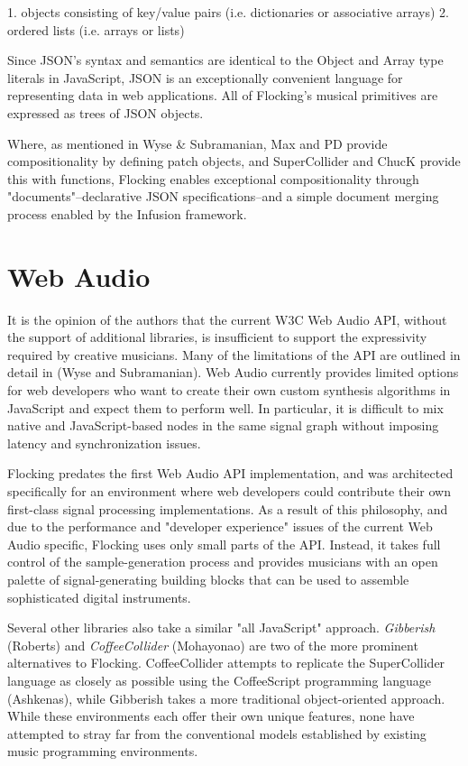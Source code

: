 \documentclass{article}
\begin{document}
1. objects consisting of key/value pairs (i.e. dictionaries or associative arrays)
2. ordered lists (i.e. arrays or lists)

Since JSON's syntax and semantics are identical to the Object and Array type literals in JavaScript, JSON is an exceptionally convenient language for representing data in web applications. All of Flocking's musical primitives are expressed as trees of JSON objects.


Where, as mentioned in Wyse \& Subramanian, Max and PD provide compositionality by defining patch objects, and SuperCollider and ChucK provide this with functions, Flocking enables exceptional compositionality through "documents"--declarative JSON specifications--and a simple document merging process enabled by the Infusion framework.

\section{Web Audio}

It is the opinion of the authors that the current W3C Web Audio API, without the support of additional libraries, is insufficient to support the expressivity required by creative musicians. Many of the limitations of the API are outlined in detail in (Wyse and Subramanian). Web Audio currently provides limited options for web developers who want to create their own custom synthesis algorithms in JavaScript and expect them to perform well. In particular, it is difficult to mix native and JavaScript-based nodes in the same signal graph without imposing latency and synchronization issues.

Flocking predates the first Web Audio API implementation, and was architected specifically for an environment where web developers could contribute their own first-class signal processing implementations. As a result of this philosophy, and due to the performance and "developer experience" issues of the current Web Audio specific, Flocking uses only small parts of the API. Instead, it takes full control of the sample-generation process and provides musicians with an open palette of signal-generating building blocks that can be used to assemble sophisticated digital instruments.

Several other libraries also take a similar "all JavaScript" approach. {\it Gibberish} (Roberts) and {\it CoffeeCollider} (Mohayonao) are two of the more prominent alternatives to Flocking. CoffeeCollider attempts to replicate the SuperCollider language as closely as possible using the CoffeeScript programming language (Ashkenas), while Gibberish takes a more traditional object-oriented approach. While these environments each offer their own unique features, none have attempted to stray far from the conventional models established by existing music programming environments.
\end{document}
